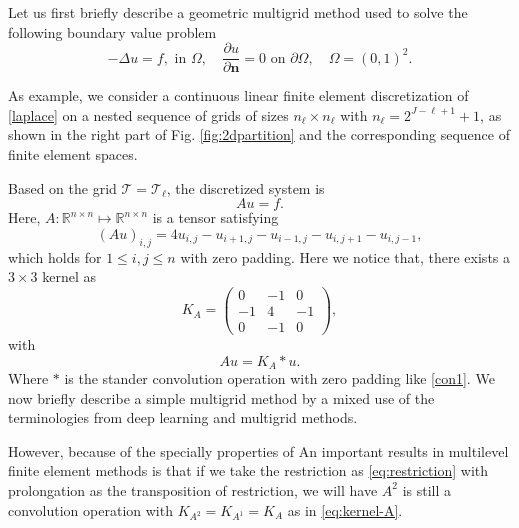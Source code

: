 Let us first briefly describe a geometric multigrid method used to solve the 
following boundary value problem
\begin{equation}
\label{laplace}
-\Delta u = f,  \mbox{ in } \Omega,\quad
\frac{\partial u}{\partial {\bm n}} =0  \mbox{ on } \partial\Omega,\quad
\Omega=(0,1)^2.
\end{equation}

As example, we consider a continuous linear finite element discretization of
\eqref{laplace} on a nested sequence of grids of sizes $n_\ell\times
n_\ell$ with $n_{\ell}=2^{J-\ell+1} + 1$, as shown in the right part of
Fig. \ref{fig:2dpartition} and the corresponding sequence of finite
element spaces.

Based on the grid $\mathcal T = \mathcal T_\ell$, the discretized system is
\begin{equation}
\label{laplace-h}
Au=f.
\end{equation}
Here,  $A:\mathbb R^{n\times n}\mapsto \mathbb R^{n\times n}$ is a tensor satisfying
\begin{equation}
\label{uniform-laplace}
(Au)_{i,j}=4u_{i,j}-u_{i+1,j}-u_{i-1,j}-u_{i,j+1}-u_{i,j-1},
\end{equation}
which holds for $1\le i,j \le n$ with zero padding. 
Here we notice that, there exists a $3\times 3$ kernel as
\begin{equation}\label{eq:kernel-A}
K_A = \begin{pmatrix}
0 & -1 & 0 \\
-1 & 4 & -1 \\
0 & -1 & 0
\end{pmatrix},
\end{equation}
with 
\begin{equation}\label{eq:convA}
Au = K_A \ast u.
\end{equation}
Where $\ast$ is the stander convolution operation with zero padding like \eqref{con1}. 
We now briefly describe a simple multigrid method by a mixed use of the terminologies from 
deep learning \cite{goodfellow2017deep} and multigrid methods.

However, because of the specially properties of 
 An important results in multilevel finite element methods is that 
if we take the restriction as \eqref{eq:restriction} with prolongation as 
the transposition of restriction, we will have $A^2$ is still a convolution operation 
with $K_{A^2} = K_{A^1} = K_A$ as in \eqref{eq:kernel-A}.

